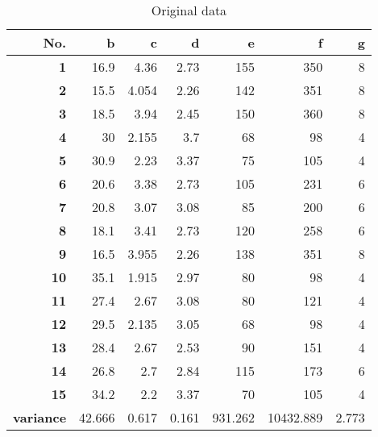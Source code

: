 \begin{table}[htbp]
  \centering
  \caption{Original data}
    \begin{tabular}{rrrrrrr}
    \toprule
    \textbf{No.} & \textbf{b} & \textbf{c} & \textbf{d} & \textbf{e} & \textbf{f} & \textbf{g} \\
    \midrule
    \textbf{1} & 16.9  & 4.36  & 2.73  & 155   & 350   & 8 \\
    \textbf{2} & 15.5  & 4.054 & 2.26  & 142   & 351   & 8 \\
    \textbf{3} & 18.5  & 3.94  & 2.45  & 150   & 360   & 8 \\
    \textbf{4} & 30    & 2.155 & 3.7   & 68    & 98    & 4 \\
    \textbf{5} & 30.9  & 2.23  & 3.37  & 75    & 105   & 4 \\
    \textbf{6} & 20.6  & 3.38  & 2.73  & 105   & 231   & 6 \\
    \textbf{7} & 20.8  & 3.07  & 3.08  & 85    & 200   & 6 \\
    \textbf{8} & 18.1  & 3.41  & 2.73  & 120   & 258   & 6 \\
    \textbf{9} & 16.5  & 3.955 & 2.26  & 138   & 351   & 8 \\
    \textbf{10} & 35.1  & 1.915 & 2.97  & 80    & 98    & 4 \\
    \textbf{11} & 27.4  & 2.67  & 3.08  & 80    & 121   & 4 \\
    \textbf{12} & 29.5  & 2.135 & 3.05  & 68    & 98    & 4 \\
    \textbf{13} & 28.4  & 2.67  & 2.53  & 90    & 151   & 4 \\
    \textbf{14} & 26.8  & 2.7   & 2.84  & 115   & 173   & 6 \\
    \textbf{15} & 34.2  & 2.2   & 3.37  & 70    & 105   & 4 \\
    \textbf{variance} & 42.666  & 0.617  & 0.161  & 931.262  & 10432.889  & 2.773  \\
    \bottomrule
    \end{tabular}%
  \label{tab:data}%
\end{table}%
